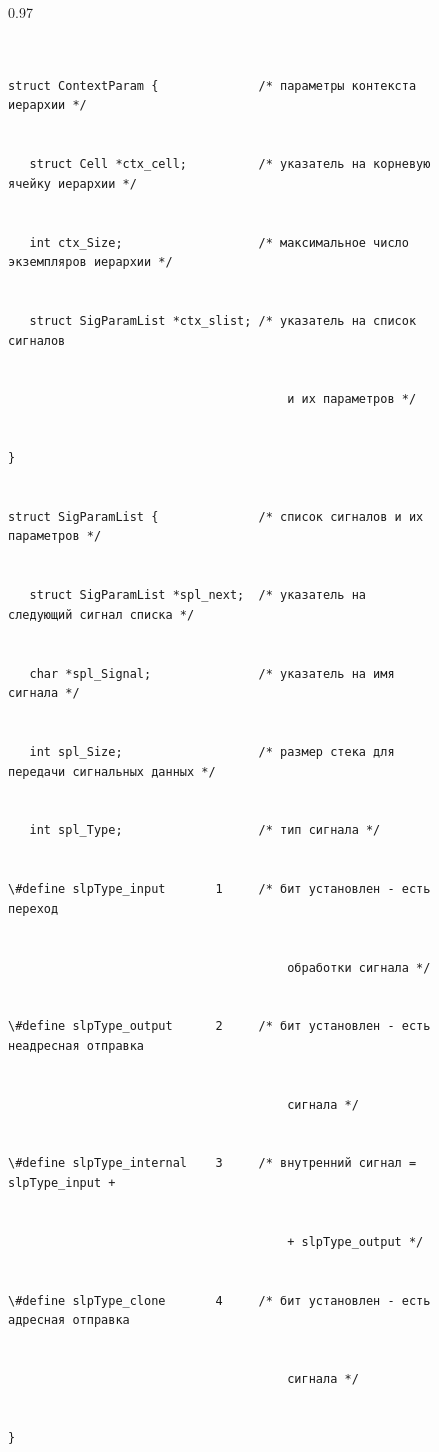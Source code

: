 \begin{figure}\scriptsize %


\begin{center}


\begin{fmpage}{0.97\textwidth}


\begin{verbatim}


struct ContextParam {              /* параметры контекста иерархии */ 


   struct Cell *ctx_cell;          /* указатель на корневую ячейку иерархии */ 


   int ctx_Size;                   /* максимальное число экземпляров иерархии */ 


   struct SigParamList *ctx_slist; /* указатель на список сигналов


                                       и их параметров */ 


} 


struct SigParamList {              /* список сигналов и их параметров */ 


   struct SigParamList *spl_next;  /* указатель на следующий сигнал списка */ 


   char *spl_Signal;               /* указатель на имя сигнала */ 


   int spl_Size;                   /* размер стека для передачи сигнальных данных */ 


   int spl_Type;                   /* тип сигнала */ 


\#define slpType_input       1     /* бит установлен - есть переход


                                       обработки сигнала */ 


\#define slpType_output      2     /* бит установлен - есть неадресная отправка


                                       сигнала */ 


\#define slpType_internal    3     /* внутренний сигнал = slpType_input + 


                                       + slpType_output */ 


\#define slpType_clone       4     /* бит установлен - есть адресная отправка


                                       сигнала */ 


}


\end{verbatim}


\end{fmpage}


\end{center}


\vspace*{-6pt}




\end{figure} 


